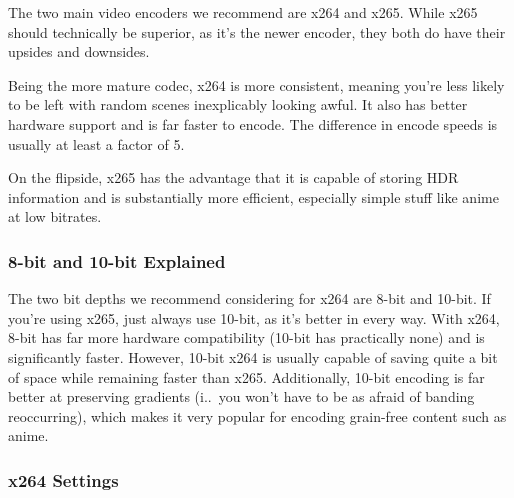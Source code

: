 \documentclass{scrartcl}
\begin{document}
The two main video encoders we recommend are x264 and x265.  While x265 should technically be superior, as it's the newer encoder, they both do have their upsides and downsides.

Being the more mature codec, x264 is more consistent, meaning you're less likely to be left with random scenes inexplicably looking awful.  It also has better hardware support and is far faster to encode.  The difference in encode speeds is usually at least a factor of 5.

On the flipside, x265 has the advantage that it is capable of storing HDR information and is substantially more efficient, especially simple stuff like anime at low bitrates.

\subsubsection{8-bit and 10-bit Explained}

The two bit depths we recommend considering for x264 are 8-bit and 10-bit.  If you're using x265, just always use 10-bit, as it's better in every way.  With x264, 8-bit has far more hardware compatibility (10-bit has practically none) and is significantly faster.  However, 10-bit x264 is usually capable of saving quite a bit of space while remaining faster than x265.  Additionally, 10-bit encoding is far better at preserving gradients (i.\@e.\ you won't have to be as afraid of banding reoccurring), which makes it very popular for encoding grain-free content such as anime.

\subsubsection{x264 Settings}
\end{document}
